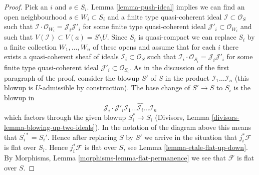 \documentclass[10pt,a4paper]{amsart}
\theoremstyle{plain}
\theoremstyle{definition}
\theoremstyle{remark}
\numberwithin{equation}{subsection}
\begin{document}
\begin{proof}
\medskip\noindent
Pick an $i$ and $s \in S_i$. Lemma \ref{lemma-push-ideal}
implies we can find an open neighbourhood $s \in W_i \subset S_i$
and a finite type quasi-coherent ideal $\mathcal{I} \subset \mathcal{O}_S$
such that $\mathcal{I} \cdot \mathcal{O}_{W_i} = \mathcal{J}_i \mathcal{J}'_i$
for some finite type quasi-coherent ideal
$\mathcal{J}'_i \subset \mathcal{O}_{W_i}$
and such that $V(\mathcal{I}) \subset V(a) = S \setminus U$.
Since $S_i$ is quasi-compact we can replace $S_i$ by a finite collection
$W_1, \ldots, W_n$ of these opens and assume that for each $i$ there exists
a quasi-coherent sheaf of ideals $\mathcal{I}_i \subset \mathcal{O}_S$ such
that $\mathcal{I}_i \cdot \mathcal{O}_{S_i} = \mathcal{J}_i \mathcal{J}'_i$
for some finite type quasi-coherent ideal
$\mathcal{J}'_i \subset \mathcal{O}_{S_i}$.
As in the discussion of the first paragraph of the proof, consider the
blowup $S'$ of $S$ in the product $\mathcal{I}_1 \ldots \mathcal{I}_n$
(this blowup is $U$-admissible by construction). The base change of $S' \to S$
to $S_i$ is the blowup in
$$
\mathcal{J}_i \cdot
\mathcal{J}'_i \mathcal{I}_1 \ldots \hat{\mathcal{I}_i} \ldots \mathcal{I}_n
$$
which factors through the given blowup $S_i^* \to S_i$
(Divisors, Lemma \ref{divisors-lemma-blowing-up-two-ideals}). In the notation
of the diagram above this means that $S_i^{\prime *} = S_i'$. Hence
after replacing $S$ by $S'$ we arrive in the situation that
$j_i^*\mathcal{F}$ is flat over $S_i$. Hence $j_i^*\mathcal{F}$ is flat
over $S$, see
Lemma \ref{lemma-etale-flat-up-down}.
By Morphisms, Lemma \ref{morphisms-lemma-flat-permanence}
we see that $\mathcal{F}$ is flat over $S$.
\end{proof}
\end{document}
